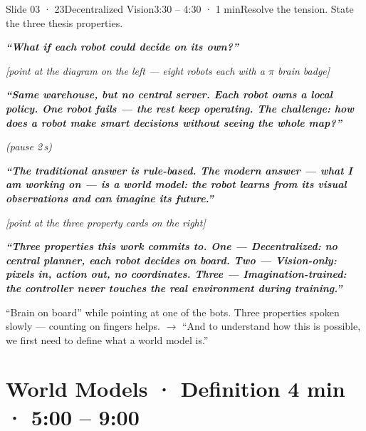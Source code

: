 \documentclass[11pt,a4paper]{article}
\newcommand{\say}[1]{%
    \par\vspace{0.3em}%
    \begingroup
    \leftskip=12pt
    \rightskip=8pt
    \color{thStrong}%
    \itshape\textbf{“#1”}%
    \par
    \endgroup
    \vspace{0.2em}
}
\newcommand{\beat}[1][2]{%
    \par\textcolor{thMuted}{\small\textit{(pause #1\,s)}}\par
    \vspace{0.2em}
}
\newcommand{\stage}[1]{%
    \par\textcolor{thMuted}{\small\textit{[#1]}}\par
    \vspace{0.2em}
}
\newcommand{\emphw}[1]{\textbf{\textcolor{thAmber}{#1}}}
\begin{document}
\begin{slide}{Slide 03 · 23}{Decentralized Vision}{3:30 – 4:30 · 1 min}{Resolve the tension. State the three thesis properties.}
\say{What if \textbf{each robot could decide on its own?}}

\stage{point at the diagram on the left — eight robots each with a $\pi$ brain badge}

\say{Same warehouse, but \textbf{no central server}. Each robot owns a local policy. One robot fails — the rest \textbf{keep operating}. The challenge: how does a robot make smart decisions without seeing the whole map?}
\beat
\say{The traditional answer is rule-based. The modern answer — what I am working on — is a \emphw{world model}: the robot learns from its visual observations and can imagine its future.}

\stage{point at the three property cards on the right}

\say{Three properties this work commits to. \textbf{One — Decentralized}: no central planner, each robot decides on board. \textbf{Two — Vision-only}: pixels in, action out, no coordinates. \textbf{Three — Imagination-trained}: the controller never touches the real environment during training.}

\begin{stagebox}
``Brain on board'' while pointing at one of the bots. Three properties spoken slowly — counting on fingers helps. $\rightarrow$ ``And to understand how this is possible, we first need to define what a world model is.''
\end{stagebox}
\end{slide}

\section{World Models · Definition \hfill \textcolor{thMuted}{\small 4 min · 5:00 – 9:00}}
\end{document}
